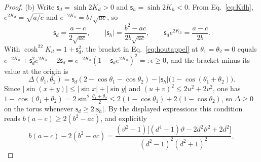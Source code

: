 \documentclass[aps,prx,reprint,superscriptaddress,nobibnotes,longbibliography]{revtex4-2}
\theoremstyle{remark}
\newcommand{\vth}{\vartheta}
\begin{document}
\begin{proof}
(b) Write $\mathsf s_d=\sinh2K_d>0$ and $\mathsf s_h=\sinh2K_h<0$.  From Eq.~\eqref{eq:Kdh}, $e^{2K_d}=\sqrt{a/c}$ and $e^{-2K_h}=b/\sqrt{ac}$, so
\begin{equation*}
 \mathsf s_d=\frac{a-c}{2\sqrt{ac}},\qquad |\mathsf s_h|=\frac{b^2-ac}{2b\sqrt{ac}},\qquad \mathsf s_de^{2K_h}=\frac{a-c}{2b}.
\end{equation*}
With $\cosh^22K_d=1+\mathsf s_d^2$, the bracket in Eq.~\eqref{eq:houtappel} at $\theta_1=\theta_2=0$ equals $e^{-2K_h}+\mathsf s_d^2e^{2K_h}-2\mathsf s_d=e^{-2K_h}(1-\mathsf s_de^{2K_h})^2=:\epsilon\ge0$, and the bracket minus its value at the origin is
\begin{equation*}
 \Delta(\theta_1,\theta_2)=\mathsf s_d(2-\cos\theta_1-\cos\theta_2)-|\mathsf s_h|\bigl(1-\cos(\theta_1+\theta_2)\bigr).
\end{equation*}
Since $|\sin(x+y)|\le|\sin x|+|\sin y|$ and $(u+v)^2\le2u^2+2v^2$, one has $1-\cos(\theta_1+\theta_2)=2\sin^2\frac{\theta_1+\theta_2}2\le2(1-\cos\theta_1)+2(1-\cos\theta_2)$, so $\Delta\ge0$ on the torus whenever $\mathsf s_d\ge2|\mathsf s_h|$.  By the displayed expressions this condition reads $b(a-c)\ge2(b^2-ac)$, and explicitly
\begin{equation*}
 b(a-c)-2(b^2-ac)=\frac{(\vth^2-1)\bigl[(d^4-1)\vth-2d^2\vth^2+2d^2\bigr]}{(d^2-1)^2(d^2+1)^2},
\end{equation*}

\end{proof}
\end{document}
